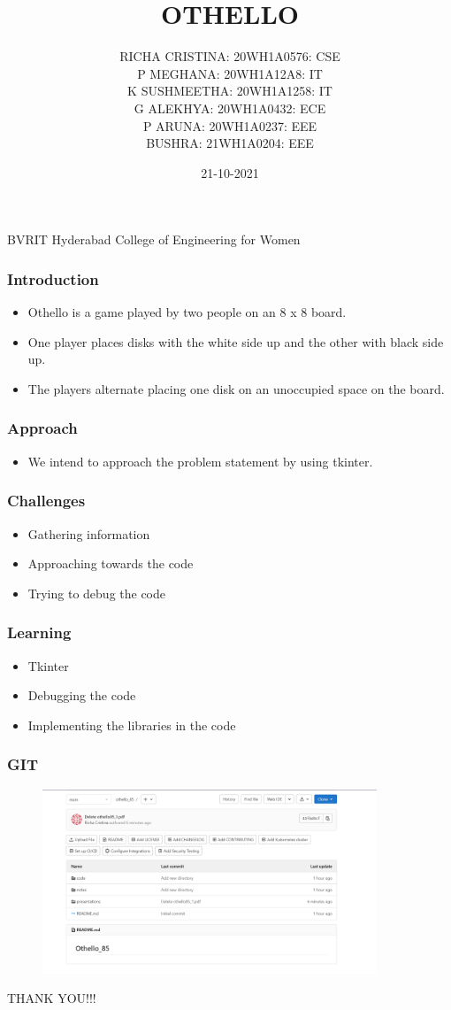 \documentclass[14pt]{beamer}
\title{OTHELLO}
\date{21-10-2021}
\author[Bvrith]{RICHA CRISTINA: 20WH1A0576: CSE  \\  P MEGHANA: 20WH1A12A8: IT \\ K SUSHMEETHA: 20WH1A1258: IT \\ G ALEKHYA: 20WH1A0432: ECE \\ P ARUNA: 20WH1A0237: EEE \\ BUSHRA: 21WH1A0204:  EEE }
\begin{document}
    \begin{frame}
        \titlepage
	\small{BVRIT Hyderabad College of Engineering for Women}
    \end{frame}
    \begin{frame}
	\frametitle{Introduction}
        \begin{itemize}
	       \item Othello is a game played by two people on an 8 x 8 board.
            \item One player places disks with the white side up and the other with black side up.
            \item The players alternate placing one disk on an unoccupied space on the board.
	\end{itemize}
    \end{frame}

    \begin{frame}
	    \frametitle{Approach}
	\begin{itemize}
	    \item We intend to approach the problem statement by using  tkinter.
	\end{itemize}
    \end{frame}


    \begin{frame}
        \frametitle{Challenges}
	\begin{itemize}
	    \item Gathering information
          \item Approaching towards the code
          \item Trying to debug the code
	\end{itemize}
    \end{frame}
    \begin{frame}
	\frametitle{Learning}
        \begin{itemize}
	    \item Tkinter
            \item Debugging the code
            \item Implementing the libraries in the code 
        \end{itemize}
    \end{frame}

    \begin{frame}
	\frametitle{GIT}
         \begin{figure}
	          \includegraphics [width = 10cm] {repository.png}
          \end {figure}
    \end{frame}
   
   
    \begin{frame}
	\begin{center}
	     THANK YOU!!!
	\end{center}
    \end{frame}
\end{document}
